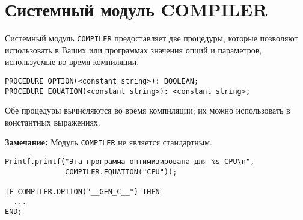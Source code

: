 \section{Системный модуль COMPILER}
\label{opt:COMPILER}

Системный модуль {\tt COMPILER} предоставляет две процедуры,
которые позволяют использовать в Ваших
\mt{} или \ot{} программах значения опций и параметров, используемые во
время компиляции.
\begin{verbatim}
PROCEDURE OPTION(<constant string>): BOOLEAN;
PROCEDURE EQUATION(<constant string>): <constant string>;
\end{verbatim}

Обе процедуры вычисляются во время компиляции; их можно использовать 
в константных выражениях.

{\bf Замечание:} Модуль {\tt COMPILER} не является стандартным.

\Examples

\begin{verbatim}
Printf.printf("Эта программа оптимизирована для %s CPU\n",
              COMPILER.EQUATION("CPU"));

IF COMPILER.OPTION("__GEN_C__") THEN
  ...
END;
\end{verbatim}



